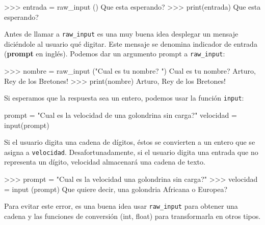 \begin{pyconcode}
>>> entrada = raw_input ()
Que esta esperando?
>>> print(entrada)
Que esta esperando?
\end{pyconcode}
 Antes de llamar a \texttt{raw\_input} es una muy buena idea desplegar
un mensaje diciéndole al usuario qué digitar. Este mensaje se denomina
indicador de entrada (\textbf{prompt} en inglés). Podemos dar un argumento
prompt a \texttt{raw\_input}:


\begin{pyconcode}
>>> nombre = raw_input ("Cual es tu nombre? ")
Cual es tu nombre? Arturo, Rey de los Bretones!
>>> print(nombre)
Arturo, Rey de los Bretones!
\end{pyconcode}

Si esperamos que la respuesta sea un entero, podemos usar la función
\texttt{input}:

\begin{pythoncode}
prompt = "Cual es la velocidad de una golondrina sin carga?\n"
velocidad = input(prompt)
\end{pythoncode}
 Si el usuario digita una cadena de dígitos, éstos se convierten a
un entero que se asigna a \texttt{velocidad}. Desafortunadamente,
si el usuario digita una entrada que no representa un dígito, velocidad
almacenará una cadena de texto.

\begin{pyconcode}
>>> prompt = "Cual es la velocidad una golondrina sin carga?\n"
>>> velocidad = input (prompt)
Que quiere decir, una golondria Africana o Europea?
\end{pyconcode}

Para evitar este error, es una buena idea usar \texttt{raw\_input}
para obtener una cadena y las funciones de conversión (int, float)
para transformarla en otros tipos.

